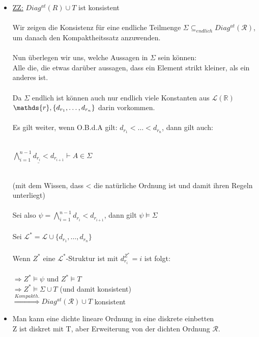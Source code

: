 \documentclass[a4paper]{scrartcl}%
\begin{document}
    \begin{itemize}
        \item \underline{ZZ:} $Diag^{at}(R) \cup T$ ist konsistent\\
            \\Wir zeigen die Konsistenz für eine endliche Teilmenge $\Sigma \subseteq_{endlich} Diag^{at}(\mathcal{R})$,\\
            um danach den Kompaktheitssatz anzuwenden.\\
            \\Nun überlegen wir uns, welche Aussagen in $\Sigma$ sein können:\\
            Alle die, die etwas darüber aussagen, dass ein Element strikt kleiner, als ein anderes ist.\\
            \\Da $\Sigma$ endlich ist können auch nur endlich viele Konstanten aus $\mathscr{L}(\mathds{R})$ $\mathds{r},\\
            \{d_{r_1},\dots,d_{r_n}\}$ darin vorkommen.\\
            \\Es gilt weiter, wenn O.B.d.A gilt: $d_{r_1} < \dots < d_{r_n}$, dann gilt auch:\\
                \\ \centerline{$\underline{\bigwedge_{i=1}^{n-1} d_{r_i} < d_{r_{i+1}}} \vdash A \in \Sigma$}\\
            (mit dem Wissen, dass < die natürliche Ordnung ist und damit ihren Regeln unterliegt)\\
            \\Sei also $\psi = \bigwedge_{i=1}^{n-1} d_{r_i} < d_{r_{i+1}}$, dann gilt $\psi \vDash \Sigma$\\
            \\Sei $\mathscr{L}^* = \mathscr{L} \cup \{d_{r_1},\dots,d_{r_n}\}$\\
            \\Wenn $Z^*$ eine $\mathscr{L}^*$-Struktur ist mit $d_{r_i}^{Z^*} = i$ ist folgt:\\
            \\$\Rightarrow Z^* \vDash \psi$ und $Z^* \vDash T$\\
            $\Rightarrow Z^* \vDash \Sigma \cup T$ \quad (und damit konsistent)\\
            $\overset{Kompakth.}{\Rightarrow} Diag^{at}(\mathcal{R}) \cup T$ konsistent\\
        \item Man kann eine dichte lineare Ordnung in eine diskrete einbetten\\
            Z ist diskret mit T, aber Erweiterung von der dichten Ordnung $\mathcal{R}$.\\
    \end{itemize}%
\end{document}
